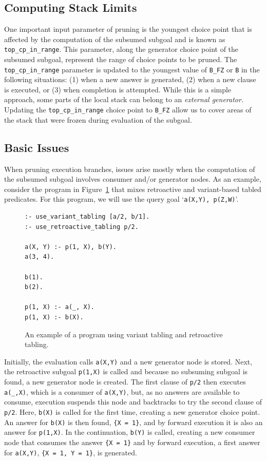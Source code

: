 \subsection{Computing Stack Limits}

One important input parameter of pruning is the youngest choice point that is affected
by the computation of the subsumed subgoal and is known as \texttt{top\_cp\_in\_range}.
This parameter, along the generator choice point of the subsumed subgoal, represent the
range of choice points to be pruned.
The \texttt{top\_cp\_in\_range} parameter is updated to the youngest value of \texttt{B\_FZ}
or \texttt{B} in the following situations:
(1) when a new answer is generated, (2) when a new clause is executed, or (3) when completion
is attempted. While this is a simple approach, some parts of the local stack can belong to an
\textit{external generator}. Updating the \texttt{top\_cp\_in\_range} choice point to
\texttt{B\_FZ} allow us to cover areas of the stack that were frozen during evaluation of the subgoal.

\subsection{Basic Issues}

When pruning execution branches, issues arise mostly when the computation of the subsumed subgoal
involves consumer and/or generator nodes. As an example, consider the program in Figure~\ref{fig:retro_program2}
that mixes retroactive and variant-based tabled predicates. For this program, we will use the query goal
`\texttt{a(X,Y),~p(Z,W)}'.

\begin{figure}[ht]
\begin{Verbatim}
:- use_variant_tabling [a/2, b/1].
:- use_retroactive_tabling p/2.

a(X, Y) :- p(1, X), b(Y).
a(3, 4).

b(1).
b(2).

p(1, X) :- a(_, X).
p(1, X) :- b(X).
\end{Verbatim}
\caption{An example of a program using variant tabling and retroactive tabling.}
\label{fig:retro_program2}
\end{figure}

Initially, the evaluation calls \texttt{a(X,Y)} and a new generator node is stored. Next, the retroactive subgoal
\texttt{p(1,X)} is called and because no subsuming subgoal is found, a new generator node is created.
The first clause of \texttt{p/2} then executes \texttt{a(\_,X)}, which is a consumer of \texttt{a(X,Y)}, but, as
no answers are available to consume, execution suspends this node and backtracks to try the second clause
of \texttt{p/2}. Here, \texttt{b(X)} is called for the first time, creating a new generator choice point.
An answer for \texttt{b(X)} is then found, \texttt{\{X~=~1\}}, and by forward execution it is also an answer
for \texttt{p(1,X)}. In the continuation, \texttt{b(Y)} is called, creating a new consumer node that consumes
the answer \texttt{\{X~=~1\}} and by forward execution, a first answer for \texttt{a(X,Y)},
\texttt{\{X~=~1,~Y~=~1\}}, is generated.

